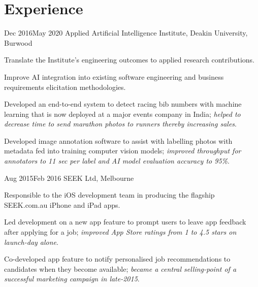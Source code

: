 \vspace{-1.5mm}
\section{Experience}
\vspace{3mm}

\def \asis{A\textsuperscript{2}I\textsuperscript{2}}

{Dec 2016}{May 2020}
{Applied Artificial Intelligence Institute, Deakin University, Burwood}
{
  \item Translate the Institute's engineering outcomes to applied research contributions.
  \item Improve AI integration into existing software engineering and business requirements elicitation methodologies.
}
{
  \item Developed an end-to-end system to detect racing bib numbers with machine learning that is now deployed at a major events company in India; \textit{helped to decrease time to send marathon photos to runners thereby increasing sales}.
  \item Developed image annotation software to assist with labelling photos with metadata fed into training computer vision models; \textit{improved throughput for annotators to 11 sec per label and AI model evaluation accuracy to 95\%}.
}

{Aug 2015}{Feb 2016}
{SEEK Ltd, Melbourne}
{
  \item Responsible to the iOS development team in producing the flagship SEEK.com.au iPhone and iPad apps.
}
{
  \item Led development on a new app feature to prompt users to leave app feedback after applying for a job; \textit{improved App Store ratings from 1  to 4.5 stars on launch-day alone}.
  \item Co-developed app feature to notify personalised job recommendations to candidates when they become available; \textit{became a central selling-point of a successful marketing campaign in late-2015}.
}


